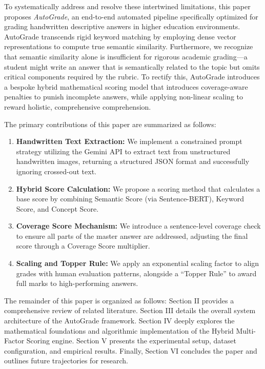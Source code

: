 \documentclass[conference]{IEEEtran}
\begin{document}
To systematically address and resolve these intertwined limitations, this paper proposes \textit{AutoGrade}, an end-to-end automated pipeline specifically optimized for grading handwritten descriptive answers in higher education environments. AutoGrade transcends rigid keyword matching by employing dense vector representations to compute true semantic similarity. Furthermore, we recognize that semantic similarity alone is insufficient for rigorous academic grading—a student might write an answer that is semantically related to the topic but omits critical components required by the rubric. To rectify this, AutoGrade introduces a bespoke hybrid mathematical scoring model that introduces coverage-aware penalties to punish incomplete answers, while applying non-linear scaling to reward holistic, comprehensive comprehension.

The primary contributions of this paper are summarized as follows:
\begin{enumerate}
    \item \textbf{Handwritten Text Extraction:} We implement a constrained prompt strategy utilizing the Gemini API to extract text from unstructured handwritten images, returning a structured JSON format and successfully ignoring crossed-out text.
    \item \textbf{Hybrid Score Calculation:} We propose a scoring method that calculates a base score by combining Semantic Score (via Sentence-BERT), Keyword Score, and Concept Score.
    \item \textbf{Coverage Score Mechanism:} We introduce a sentence-level coverage check to ensure all parts of the master answer are addressed, adjusting the final score through a Coverage Score multiplier.
    \item \textbf{Scaling and Topper Rule:} We apply an exponential scaling factor to align grades with human evaluation patterns, alongside a ``Topper Rule'' to award full marks to high-performing answers.
\end{enumerate}

The remainder of this paper is organized as follows: Section II provides a comprehensive review of related literature. Section III details the overall system architecture of the AutoGrade framework. Section IV deeply explores the mathematical foundations and algorithmic implementation of the Hybrid Multi-Factor Scoring engine. Section V presents the experimental setup, dataset configuration, and empirical results. Finally, Section VI concludes the paper and outlines future trajectories for research.
\end{document}
